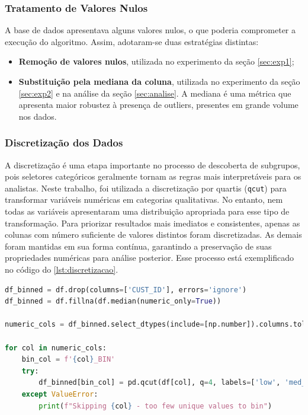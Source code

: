\documentclass[12pt]{article}
\begin{document}
\subsubsection{Tratamento de Valores Nulos}

\hspace{1.2cm}A base de dados apresentava alguns valores nulos, o que poderia comprometer a execução do algoritmo. Assim, adotaram-se duas estratégias distintas:
\begin{itemize}
    \item \textbf{Remoção de valores nulos}, utilizada no experimento da seção \ref{sec:exp1};
    \item \textbf{Substituição pela mediana da coluna}, utilizada no experimento da seção \ref{sec:exp2} e na análise da seção \ref{sec:analise}. A mediana é uma métrica que apresenta maior robustez à presença de outliers, presentes em grande volume nos dados.
\end{itemize}

\subsubsection{Discretização dos Dados} \label{sec:discretizacao}

\hspace{1.2cm}A discretização é uma etapa importante no processo de descoberta de subgrupos, pois seletores categóricos geralmente tornam as regras mais interpretáveis para os analistas. Neste trabalho, foi utilizada a discretização por quartis (\texttt{qcut}) para transformar variáveis numéricas em categorias qualitativas. No entanto, nem todas as variáveis apresentaram uma distribuição apropriada para esse tipo de transformação. Para priorizar resultados mais imediatos e consistentes, apenas as colunas com número suficiente de valores distintos foram discretizadas. As demais foram mantidas em sua forma contínua, garantindo a preservação de suas propriedades numéricas para análise posterior. Esse processo está exemplificado no código do  \autoref{lst:discretizacao}.

\begin{center}
    \begin{lstlisting}[language=Python, caption={Discretização automática com quartis para variáveis numéricas.}, label={lst:discretizacao}]
df_binned = df.drop(columns=['CUST_ID'], errors='ignore')
df_binned = df.fillna(df.median(numeric_only=True))

numeric_cols = df_binned.select_dtypes(include=[np.number]).columns.tolist()

for col in numeric_cols:
    bin_col = f'{col}_BIN'
    try:
        df_binned[bin_col] = pd.qcut(df[col], q=4, labels=['low', 'med_low', 'med_high', 'high'])
    except ValueError:
        print(f"Skipping {col} - too few unique values to bin")
\end{lstlisting}
\end{center}
\end{document}
